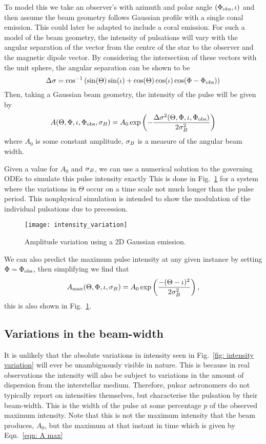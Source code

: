 \documentclass[../full_thesis/full_thesis.tex]{subfiles}
\begin{document}
To model this we take an observer's with azimuth and polar angle $(\Phi_{\mathrm{obs}}, \iota)$ and then
assume the beam geometry follows Gaussian profile with a single conal emission.
This could later be adapted to include a coral emission.  For such a model of
the beam geometry, the intensity of pulsations will vary with the angular
separation of the vector from the centre of the star to the observer and the
magnetic dipole vector. By considering the intersection of these vectors with
the unit sphere, the angular separation can be shown to be
\begin{equation}
\Delta\sigma = \cos^{-1}\left(\sin(\Theta)\sin(\iota) +
                             \cos(\Theta)\cos(\iota)\cos(\Phi - \Phi_{\mathrm{obs}})\right)
\label{eqn: angular sep inv cos}
\end{equation}
Then, taking a Gaussian beam geometry, the intensity of the pulse will be given by
\begin{equation}
A(\Theta, \Phi, \iota, \Phi_{\mathrm{obs}}, \sigma_{B}) =
A_{0} \exp\left(-\frac{\Delta\sigma^{2}(\Theta, \Phi, \iota, \Phi_{\mathrm{obs}})}{2\sigma_{B}^{2}}\right)
\label{eqn: gaussian beam intensity}
\end{equation}
where $A_{0}$ is some constant amplitude, $\sigma_{B}$ is a measure of the
angular beam width.

Given a value for $A_0$ and $\sigma_{B}$, we can use a numerical solution to the
governing ODEs to simulate this pulse intensity exactly This is done in
Fig.~\ref{fig: intensity variation} for a system where the variations in
$\Theta$ occur on a time scale not much longer than the pulse period. This
nonphysical simulation is intended to show the modulation of the individual
pulsations due to precession.
\begin{figure}[htb]
\centering
\texttt{[image: intensity\_variation]}
\caption{Amplitude variation using a 2D Gaussian emission.}
\label{fig: intensity variation}
\end{figure}
We can also predict the maximum pulse intensity at any given instance by setting
$\Phi=\Phi_{\mathrm{obs}}$, then simplifying we find that
\begin{align}
A_{\mathrm{max}}(\Theta, \Phi, \iota, \sigma_{B}) =
A_{0}\exp\left(\frac{-(\Theta-\iota)^{2}}{2\sigma_{B}^{2}}\right),
\label{eqn: A max}
\end{align}
this is also shown in Fig.~\ref{fig: intensity variation}.

\subsection{Variations in the beam-width}
It is unlikely that the absolute variations in intensity seen in Fig.~\ref{fig:
intensity variation} will ever be unambiguously visible in nature. This is
because in real observations the intensity will also be
subject to variations in the
amount of dispersion from the interstellar medium. Therefore, pulsar astronomers
do not typically report on intensities themselves, but characterise the pulsation
by their beam-width. This is the width of the pulse at some percentage $p$ of
the observed maximum intensity. Note that this is not the maximum intensity that
the beam produces, $A_0$, but the maximum at that instant in time which is
given by Eqn.~\eqref{eqn: A max}
\end{document}
